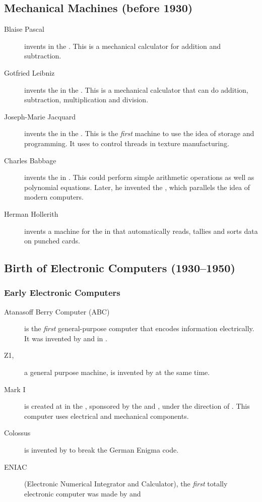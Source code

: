 \documentclass[\main/notes.tex]{subfiles}
\begin{document}
			\subsection{Mechanical Machines (before 1930)}
				\begin{description}
					\item[Blaise Pascal] invents  in the . This is a mechanical calculator for addition and subtraction.
					\item[Gotfried Leibniz] invents the  in the . This is a mechanical calculator that can do addition, subtraction, multiplication and division.
					\item[Joseph-Marie Jacquard] invents the  in the . This is the \emph{first} machine to use the idea of storage and programming. It uses  to control threads in texture manufacturing.
					\item[Charles Babbage] invents the  in . This could perform simple arithmetic operations as well as polynomial equations. Later, he invented the , which parallels the idea of modern computers.
					\item[Herman Hollerith] invents a machine for the  in  that automatically reads, tallies and sorts data on punched cards.
				\end{description}
			\subsection{Birth of Electronic Computers (1930--1950)}
				\subsubsection{Early Electronic Computers}
					\begin{description}
						\item[Atanasoff Berry Computer (ABC)] is the \emph{first} general-purpose computer that encodes information electrically. It was invented by  and  in .
						\item[Z1,] a general purpose machine, is invented by  at the same time.
						\item[Mark I] is created at  in the , sponsored by the  and , under the direction of . This computer uses electrical and mechanical components.
						\item[Colossus] is invented by  to break the German Enigma code.
						\item[ENIAC] (Electronic Numerical Integrator and Calculator), the \emph{first} totally electronic computer was made by  and  
					\end{description}
\end{document}
